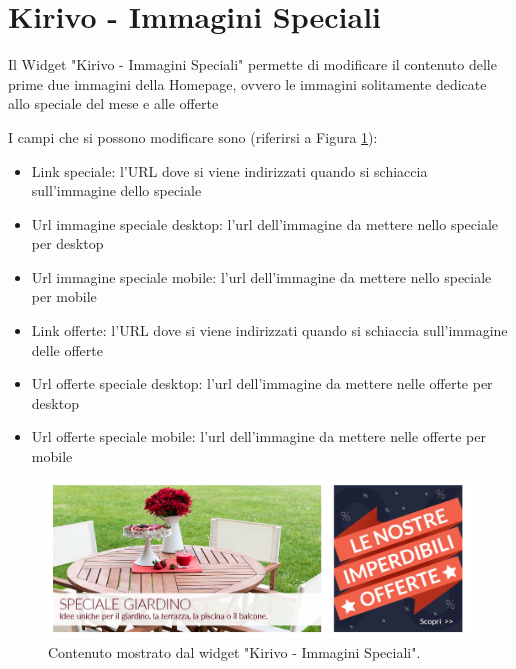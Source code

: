 




\newpage


\section{Kirivo - Immagini Speciali}

Il Widget "Kirivo - Immagini Speciali" permette di modificare il contenuto
delle prime due immagini della Homepage, ovvero le immagini solitamente dedicate
allo speciale del mese e alle offerte 

I campi che si possono modificare sono (riferirsi a Figura \ref{fig:kspec}):
\begin{itemize}
\item Link speciale: l'URL dove si viene indirizzati quando si schiaccia sull'immagine dello speciale
\item Url immagine speciale desktop: l'url dell'immagine da mettere nello speciale per desktop
\item Url immagine speciale mobile: l'url dell'immagine da mettere nello speciale per mobile
\item Link offerte: l'URL dove si viene indirizzati quando si schiaccia sull'immagine delle offerte
\item Url offerte speciale desktop: l'url dell'immagine da mettere nelle offerte per desktop
\item Url offerte speciale mobile: l'url dell'immagine da mettere nelle offerte per mobile
\end{itemize}

\begin{figure}
  \includegraphics[width=\textwidth]{figure/kspec.png}
  \caption{Contenuto mostrato dal widget "Kirivo - Immagini Speciali".}
  \label{fig:kspec}
\end{figure}

